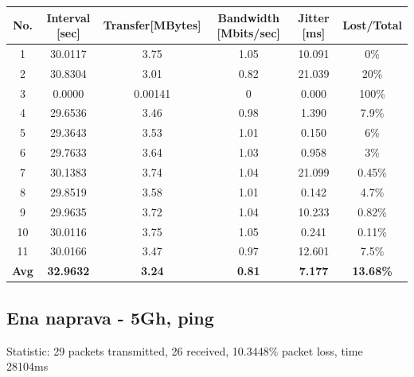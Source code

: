\documentclass[11pt,a4paper,slovene]{article}
\begin{document}
\begin{table}[H]
	\begin{adjustwidth}{-3cm}{-3cm}
	\centering
		\begin{tabular}{c|c|c|c|c|c}
		\hline
		\textbf{No.} & \textbf{Interval [sec]} & \textbf{Transfer[MBytes]} & \textbf{Bandwidth [Mbits/sec]} & \textbf{Jitter [ms]} & \textbf{Lost/Total} \\
     		\hline
     		1 & 30.0117 & 3.75 & 1.05 & 10.091 & 0\% \\
  		2 & 30.8304 & 3.01 & 0.82 & 21.039 & 20\% \\
  		3 & 0.0000 & 0.00141 & 0 & 0.000 & 100\% \\
  		4 & 29.6536 & 3.46 & 0.98 & 1.390 & 7.9\% \\
  		5 & 29.3643 & 3.53 & 1.01 & 0.150 & 6\% \\
  		6 & 29.7633 & 3.64 & 1.03 & 0.958 & 3\% \\
  		7 & 30.1383 & 3.74 & 1.04 & 21.099 & 0.45\% \\
  		8 & 29.8519 & 3.58 & 1.01 & 0.142 & 4.7\% \\
  		9 & 29.9635 & 3.72 & 1.04 & 10.233 & 0.82\% \\
  		10 & 30.0116 & 3.75 & 1.05 & 0.241 & 0.11\% \\
  		11 & 30.0166 & 3.47 & 0.97 & 12.601 & 7.5\% \\
  		\hline
  		\textbf{Avg} & \textbf{32.9632} & \textbf{3.24} & \textbf{0.81} & \textbf{7.177} & \textbf{13.68\%} \\
  		\hline
    		\end{tabular}
    	\end{adjustwidth}
\end{table}

\subsection{Ena naprava - 5Gh, ping}

Statistic: 29 packets transmitted, 26 received, 10.3448\% packet loss, time 28104ms
 
\end{document}
